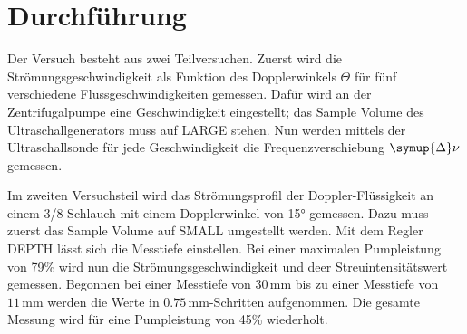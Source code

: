\section{Durchführung}
\label{sec:Durchführung}

Der Versuch besteht aus zwei Teilversuchen. Zuerst wird die Strömungsgeschwindigkeit als Funktion des Dopplerwinkels $\Theta$ für fünf verschiedene
Flussgeschwindigkeiten gemessen. Dafür wird an der Zentrifugalpumpe eine Geschwindigkeit eingestellt; das Sample Volume des Ultraschallgenerators 
muss auf LARGE stehen. Nun werden mittels der Ultraschallsonde für jede Geschwindigkeit die Frequenzverschiebung $\symup{\Delta} \nu$ gemessen.

Im zweiten Versuchsteil wird das Strömungsprofil der Doppler-Flüssigkeit an einem 3/8-Schlauch mit einem Dopplerwinkel von 15° gemessen. Dazu muss zuerst 
das Sample Volume auf SMALL umgestellt werden. Mit dem Regler DEPTH lässt sich die Messtiefe einstellen. Bei einer maximalen Pumpleistung von 79\% 
wird nun die Strömungsgeschwindigkeit und deer Streuintensitätswert gemessen. Begonnen bei einer Messtiefe von $30\,\unit{\milli\meter}$ bis zu einer 
Messtiefe von $11\,\unit{\milli\meter}$ werden die Werte in $0.75\,\unit{\milli\meter}$-Schritten aufgenommen. Die gesamte Messung wird für eine 
Pumpleistung von 45\% wiederholt.
